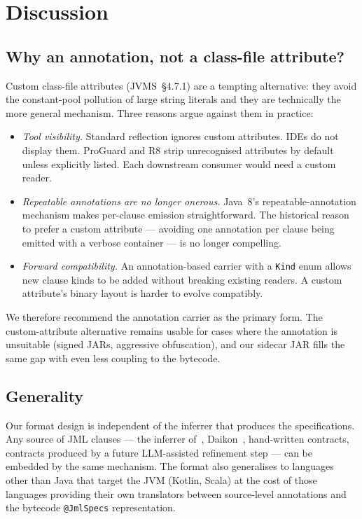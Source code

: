 \section{Discussion}
\label{sec:discussion}

\subsection{Why an annotation, not a class-file attribute?}

Custom class-file attributes (JVMS~\S4.7.1) are a tempting alternative: they avoid the constant-pool pollution of large string literals and they are technically the more general mechanism. Three reasons argue against them in practice:

\begin{itemize}
    \item \emph{Tool visibility.} Standard reflection ignores custom attributes. IDEs do not display them. ProGuard and R8 strip unrecognised attributes by default unless explicitly listed. Each downstream consumer would need a custom reader.
    \item \emph{Repeatable annotations are no longer onerous.} Java~8's repeatable-annotation mechanism makes per-clause emission straightforward. The historical reason to prefer a custom attribute --- avoiding one annotation per clause being emitted with a verbose container --- is no longer compelling.
    \item \emph{Forward compatibility.} An annotation-based carrier with a \texttt{Kind} enum allows new clause kinds to be added without breaking existing readers. A custom attribute's binary layout is harder to evolve compatibly.
\end{itemize}

We therefore recommend the annotation carrier as the primary form. The custom-attribute alternative remains usable for cases where the annotation is unsuitable (signed JARs, aggressive obfuscation), and our sidecar JAR fills the same gap with even less coupling to the bytecode.

\subsection{Generality}

Our format design is independent of the inferrer that produces the specifications. Any source of JML clauses --- the inferrer of~\cite{edmonds2026inference}, Daikon~\cite{ernst2007daikon}, hand-written contracts, contracts produced by a future LLM-assisted refinement step --- can be embedded by the same mechanism. The format also generalises to languages other than Java that target the JVM (Kotlin, Scala) at the cost of those languages providing their own translators between source-level annotations and the bytecode \texttt{@JmlSpecs} representation.

